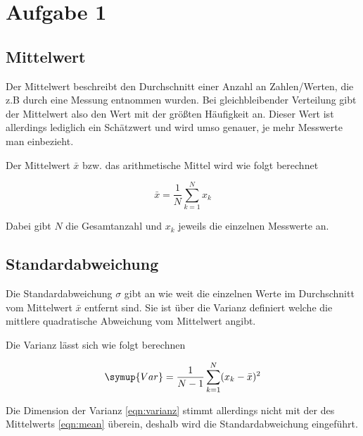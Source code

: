\section{Aufgabe 1}

\subsection{Mittelwert}
Der Mittelwert beschreibt den Durchschnitt einer Anzahl an Zahlen/Werten, die z.B durch 
eine Messung entnommen wurden. Bei gleichbleibender Verteilung gibt der Mittelwert also den Wert 
mit der größten Häufigkeit an. Dieser Wert ist allerdings lediglich ein Schätzwert und wird umso
genauer, je mehr Messwerte man einbezieht.

\begin{flushleft}
Der Mittelwert $\bar{x}$ bzw. das arithmetische Mittel wird wie folgt berechnet
\end{flushleft}

\begin{equation}
\bar{x} = \frac{1}{N} \sum_{k=1}^N x_k
\label{eqn:mean}
\end{equation}

\begin{flushleft}
Dabei gibt $N$ die Gesamtanzahl und $x_k$ jeweils die einzelnen Messwerte an.
\end{flushleft}

\subsection{Standardabweichung}
Die Standardabweichung $\sigma$ gibt an wie weit die einzelnen Werte im Durchschnitt
vom Mittelwert $\bar{x}$ entfernt sind. Sie ist über die Varianz definiert welche die mittlere 
quadratische Abweichung vom Mittelwert angibt. 

\begin{flushleft}
Die Varianz lässt sich wie folgt berechnen
\end{flushleft}
\begin{equation}
\symup{Var} = \frac{1}{N-1} \sum_{k=1}^N (x_k - \bar{x})^2
\label{eqn:varianz}
\end{equation}

\begin{flushleft}
Die Dimension der Varianz \eqref{eqn:varianz} stimmt allerdings nicht mit der des Mittelwerts \eqref{eqn:mean} überein,
deshalb wird die Standardabweichung eingeführt. 
\end{flushleft}

